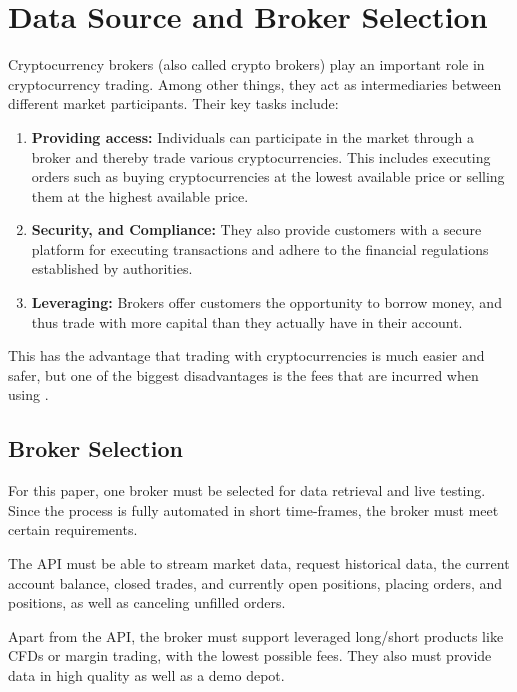 \section{Data Source and Broker Selection}
\label{chap:broker}

Cryptocurrency brokers (also called crypto brokers) play an important role in cryptocurrency trading.
Among other things, they act as intermediaries between different market participants.
Their key tasks include:

\begin{enumerate}
    \item \textbf{Providing access:} Individuals can participate in the market through a broker and thereby trade various cryptocurrencies.
    This includes executing orders such as buying cryptocurrencies at the lowest available price or selling them at the highest available price.
    \item \textbf{Security, and Compliance:} They also provide customers with a secure platform for executing transactions and adhere to the financial regulations established by authorities.
    \item \textbf{Leveraging:} Brokers offer customers the opportunity to borrow money, and thus trade with more capital than they actually have in their account.
\end{enumerate}


\noindent
This has the advantage that trading with cryptocurrencies is much easier and safer, but one of the biggest disadvantages is the fees that are incurred when using \cite{broker-investing}.

\subsection{Broker Selection}
\label{chap:broker-selection}

For this paper, one broker must be selected for data retrieval and live testing.
Since the process is fully automated in short time-frames, the broker must meet certain requirements.

The API must be able to stream market data, request historical data, the current account balance, closed trades, and currently open positions, placing orders, and positions, as well as canceling unfilled orders.

Apart from the API, the broker must support leveraged long/short products like CFDs or margin trading, with the lowest possible fees.
They also must provide data in high quality as well as a demo depot.

